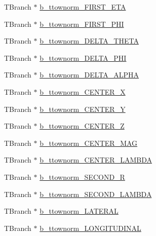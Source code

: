 \begin{DoxyCompactItemize}
\item 
T\+Branch $\ast$ \hyperlink{classJetAnalysisExample_a2f12638b30f8f7847e7a6b671164d403}{b\+\_\+ttownorm\+\_\+\+F\+I\+R\+S\+T\+\_\+\+E\+TA}
\item 
T\+Branch $\ast$ \hyperlink{classJetAnalysisExample_a20f60a2a258910f929c46df4b91d86bf}{b\+\_\+ttownorm\+\_\+\+F\+I\+R\+S\+T\+\_\+\+P\+HI}
\item 
T\+Branch $\ast$ \hyperlink{classJetAnalysisExample_a3752dc52626aa9b489918b06e0cf740e}{b\+\_\+ttownorm\+\_\+\+D\+E\+L\+T\+A\+\_\+\+T\+H\+E\+TA}
\item 
T\+Branch $\ast$ \hyperlink{classJetAnalysisExample_a456e72e66ddab4a92efc478ee2ecf106}{b\+\_\+ttownorm\+\_\+\+D\+E\+L\+T\+A\+\_\+\+P\+HI}
\item 
T\+Branch $\ast$ \hyperlink{classJetAnalysisExample_abd75f8bc211027bd2ed54dc5f43b38c8}{b\+\_\+ttownorm\+\_\+\+D\+E\+L\+T\+A\+\_\+\+A\+L\+P\+HA}
\item 
T\+Branch $\ast$ \hyperlink{classJetAnalysisExample_ad8c6900a30aa4d6f172a821c755779db}{b\+\_\+ttownorm\+\_\+\+C\+E\+N\+T\+E\+R\+\_\+X}
\item 
T\+Branch $\ast$ \hyperlink{classJetAnalysisExample_a71f6e9f72d78217012272f131dc75815}{b\+\_\+ttownorm\+\_\+\+C\+E\+N\+T\+E\+R\+\_\+Y}
\item 
T\+Branch $\ast$ \hyperlink{classJetAnalysisExample_ac27a2ceae913289aa23053e497705db5}{b\+\_\+ttownorm\+\_\+\+C\+E\+N\+T\+E\+R\+\_\+Z}
\item 
T\+Branch $\ast$ \hyperlink{classJetAnalysisExample_a95d157b902991fb37795bcf1c6441b18}{b\+\_\+ttownorm\+\_\+\+C\+E\+N\+T\+E\+R\+\_\+\+M\+AG}
\item 
T\+Branch $\ast$ \hyperlink{classJetAnalysisExample_a19cb4041a32f2eceddd4734413849122}{b\+\_\+ttownorm\+\_\+\+C\+E\+N\+T\+E\+R\+\_\+\+L\+A\+M\+B\+DA}
\item 
T\+Branch $\ast$ \hyperlink{classJetAnalysisExample_a1ad2dfefdbdcd02405775ead0e9fb5b2}{b\+\_\+ttownorm\+\_\+\+S\+E\+C\+O\+N\+D\+\_\+R}
\item 
T\+Branch $\ast$ \hyperlink{classJetAnalysisExample_ad03c6c1fcea735e4e6a5ca99c5486807}{b\+\_\+ttownorm\+\_\+\+S\+E\+C\+O\+N\+D\+\_\+\+L\+A\+M\+B\+DA}
\item 
T\+Branch $\ast$ \hyperlink{classJetAnalysisExample_acfb952d07dcc47b9c126bd75488248dc}{b\+\_\+ttownorm\+\_\+\+L\+A\+T\+E\+R\+AL}
\item 
T\+Branch $\ast$ \hyperlink{classJetAnalysisExample_aae7042ae8404b929b1ab8aea8d668037}{b\+\_\+ttownorm\+\_\+\+L\+O\+N\+G\+I\+T\+U\+D\+I\+N\+AL}

\end{DoxyCompactItemize}
